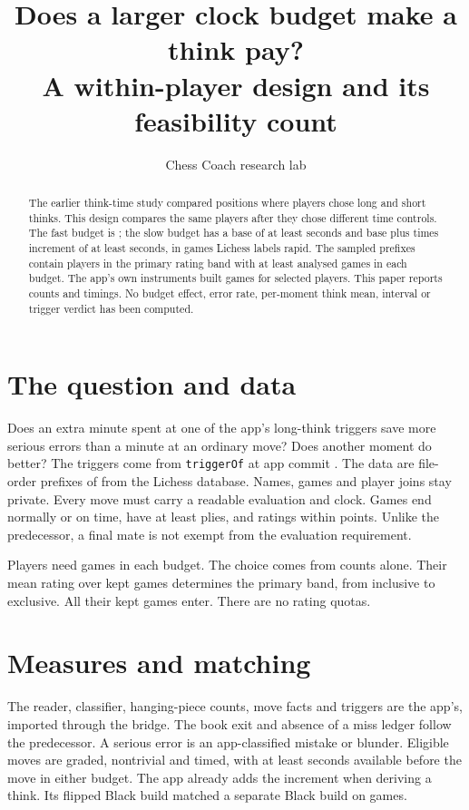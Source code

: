 \documentclass[11pt]{article}
\title{Does a larger clock budget make a think pay?\\[0.3em]
\large A within-player design and its feasibility count}
\author{Chess Coach research lab}
\date{}
\begin{document}
\maketitle

\begin{abstract}
The earlier think-time study compared positions where players chose long
and short thinks. This design compares the same players after they chose
different time controls. The fast budget is \FastControl; the slow budget
has a base of at least \MinBase{} seconds and base plus \IncrementMultiplier{}
times increment of at least \MinBudget{} seconds, in games Lichess labels
rapid. The sampled prefixes contain \PrimaryPlayers{} players in the primary
rating band with at least \MinimumGames{} analysed games in each budget.
The app's own instruments built \BuiltGames{} games for selected players.
This paper reports counts and timings. No budget effect, error rate,
per-moment think mean, interval or trigger verdict has been computed.
\end{abstract}

\section{The question and data}
Does an extra minute spent at one of the app's long-think triggers save
more serious errors than a minute at an ordinary move? Does another moment
do better? The triggers come from \texttt{triggerOf} at app commit
\texttt{\AppCommit}. The data are file-order prefixes of \Months{} from the
Lichess database. Names, games and player joins stay private. Every move
must carry a readable evaluation and clock. Games end normally or on time,
have at least \MinPlies{} plies, and ratings within \RatingGap{} points.
Unlike the predecessor, a final mate is not exempt from the evaluation
requirement.

\begin{table}[h]
\centering\small\SourceTable
\caption{The actual source prefixes, not whole-month counts.}
\end{table}

Players need \MinimumGames{} games in each budget. The choice comes from
counts alone. Their mean rating over kept games determines the primary
band, from \RatingLo{} inclusive to \RatingHi{} exclusive. All their kept
games enter. There are no rating quotas.

\section{Measures and matching}
The reader, classifier, hanging-piece counts, move facts and triggers are
the app's, imported through the bridge. The book exit and absence of a miss
ledger follow the predecessor. A serious error is an app-classified
mistake or blunder. Eligible moves are graded, nontrivial and timed, with
at least \MinClock{} seconds available before the move in either budget.
The app already adds the increment when deriving a think. Its flipped
Black build matched a separate Black build on \BlackChecked{} games.
\end{document}
